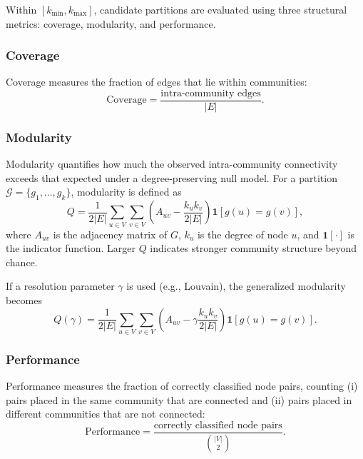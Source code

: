 \documentclass[conference]{IEEEtran}
\begin{document}
Within $[k_{\min}, k_{\max}]$, candidate partitions are evaluated using three structural metrics: coverage, modularity, and performance.

\subsubsection{Coverage}
Coverage measures the fraction of edges that lie within communities:
\begin{equation}
\mathrm{Coverage}=
\frac{\text{intra-community edges}}{|E|}.
\label{eq:coverage}
\end{equation}

\subsubsection{Modularity}
Modularity quantifies how much the observed intra-community connectivity exceeds that expected under a degree-preserving null model. For a partition $\mathcal{G}=\{g_1,\dots,g_k\}$, modularity is defined as
\begin{equation}
Q=
\frac{1}{2|E|}
\sum_{u\in V}\sum_{v\in V}
\left(
A_{uv}-\frac{k_u k_v}{2|E|}
\right)\mathbf{1}\!\left[g(u)=g(v)\right],
\label{eq:modularity}
\end{equation}
where $A_{uv}$ is the adjacency matrix of $G$, $k_u$ is the degree of node $u$, and $\mathbf{1}[\cdot]$ is the indicator function. Larger $Q$ indicates stronger community structure beyond chance.

If a resolution parameter $\gamma$ is used (e.g., Louvain), the generalized modularity becomes
\begin{equation}
Q(\gamma)=
\frac{1}{2|E|}
\sum_{u\in V}\sum_{v\in V}
\left(
A_{uv}-\gamma\frac{k_u k_v}{2|E|}
\right)\mathbf{1}\!\left[g(u)=g(v)\right].
\label{eq:modularity_gamma}
\end{equation}

\subsubsection{Performance}
Performance measures the fraction of correctly classified node pairs, counting (i) pairs placed in the same community that are connected and (ii) pairs placed in different communities that are not connected:
\begin{equation}
\mathrm{Performance}=
\frac{\text{correctly classified node pairs}}{\binom{|V|}{2}}.
\label{eq:performance}
\end{equation}
\end{document}
